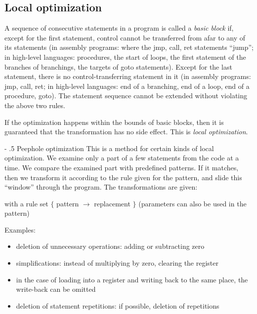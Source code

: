\documentclass[margin=0px]{article}
\makeatletter
\renewcommand\paragraph{%
    \@startsection{paragraph}{4}{0mm}%
    {-\baselineskip}%
    {.5\baselineskip}%
    {\normalfont\normalsize\bfseries}}
\makeatother
\begin{document}
\subsection{Local optimization}

A sequence of consecutive statements in a program is called a \textit{basic block} if, except for the first statement, control cannot be transferred from afar to any of its statements (in assembly programs: where the jmp, call, ret statements ``jump''; in high-level languages: procedures, the start of loops, the first statement of the branches of branchings, the targets of goto statements). Except for the last statement, there is no control-transferring statement in it (in assembly programs: jmp, call, ret; in high-level languages: end of a branching, end of a loop, end of a procedure, goto). The statement sequence cannot be extended without violating the above two rules.

If the optimization happens within the bounds of basic blocks, then it is guaranteed that the transformation has no side effect. This is \textit{local optimization}.

\paragraph{Peephole optimization}
This is a method for certain kinds of local optimization. We examine only a part of a few statements from the code at a time. We compare the examined part with predefined patterns. If it matches, then we transform it according to the rule given for the pattern, and slide this ``window'' through the program. The transformations are given:
\begin{center}
    with a rule set $ \lbrace$ pattern $ \rightarrow $ replacement $\rbrace$
    (parameters can also be used in the pattern)
\end{center}

Examples:
\begin{itemize}
    \item
          deletion of unnecessary operations: adding or subtracting zero
    \item
          simplifications: instead of multiplying by zero, clearing the register
    \item
          in the case of loading into a register and writing back to the same place, the write-back can be omitted
    \item
          deletion of statement repetitions: if possible, deletion of repetitions
\end{itemize}
\end{document}
